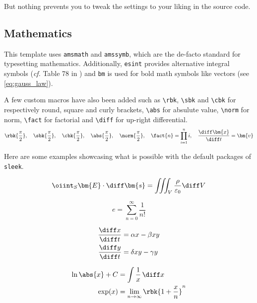 \documentclass[12pt]{report}
\def\tbs{\textbackslash}
\begin{document}
    But nothing prevents you to tweak the settings to your liking in the source code.

    \subsection{Mathematics}

    This template uses \texttt{amsmath} and \texttt{amssymb}, which are the de-facto standard for typesetting mathematics. Additionally, \texttt{esint} provides alternative integral symbols (\emph{cf.} Table 78 in \cite{pakin2020comprehensive}) and \texttt{bm} is used for bold math symbols like vectors (see \eqref{eq:gauss_law}).

    A few custom macros have also been added such as \texttt{\tbs{}rbk}, \texttt{\tbs{}sbk} and \texttt{\tbs{}cbk} for respectively round, square and curly brackets, \texttt{\tbs{}abs} for absulute value, \texttt{\tbs{}norm} for norm, \texttt{\tbs{}fact} for factorial and \texttt{\tbs{}diff} for up-right differential.
    $$
        \rbk{\frac{\pi}{2}}, \quad \sbk{\frac{\pi}{2}}, \quad \cbk{\frac{\pi}{2}}, \quad \abs{\frac{\pi}{2}}, \quad \norm{\frac{\pi}{2}}, \quad \fact{n} = \prod_{i = 1}^{n} i, \quad \frac{\diff \bm{x}}{\diff t} = \bm{v}
    $$

    Here are some examples showcasing what is possible with the default packages of \texttt{sleek}.

    \begin{equation}\label{eq:gauss_law}
        \oiint_S \bm{E} \cdot \diff \bm{s} = \iiint_V \frac{\rho}{\varepsilon_0} \diff V
    \end{equation}

    \begin{equation*}
        e = \sum_{n=0}^\infty \frac{1}{n!}
    \end{equation*}

    \begin{subequations}
        \begin{align}
            \frac{\diff x}{\diff t} & = \alpha x - \beta xy \\
            \frac{\diff y}{\diff t} & = \delta xy - \gamma y
        \end{align}
    \end{subequations}

    \begin{align*}
        \ln \abs{x} + C & = \int \frac{1}{x} \,\diff x \\
        \exp(x) & = \lim_{n \to \infty} \rbk{1 + \frac{x}{n}}^n
    \end{align*}
\end{document}

